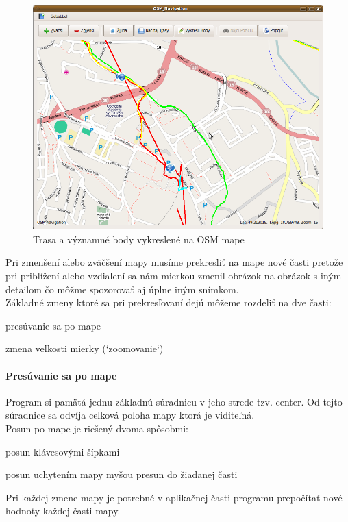 \begin{figure}[ht]
\centering
\includegraphics[width=14.5cm]{obr/mapa}
\caption{Trasa a významné body vykreslené na OSM mape}
\end{figure}



Pri zmenšení alebo zväčšení mapy musíme prekresliť na mape nové časti pretože pri priblížení alebo vzdialení sa nám mierkou zmenil obrázok na obrázok s iným detailom čo môžme spozorovať aj úplne iným snímkom.\\
Základné zmeny ktoré sa pri prekresľovaní dejú môžeme rozdeliť na dve časti: 
\begin{list}{•}
\item presúvanie sa po mape 
\item
\item zmena veľkosti mierky (`zoomovanie`)
\end{list}

\paragraph{Presúvanie sa po mape}
Program si pamätá jednu základnú súradnicu v jeho strede tzv. center. Od tejto súradnice sa odvíja celková poloha mapy ktorá je viditeľná.\\
Posun po mape je riešený dvoma spôsobmi:
\begin{list}{•}
\item posun klávesovými šípkami
\item
\item posun uchytením mapy myšou presun do žiadanej časti
\end{list}
Pri každej zmene mapy je potrebné v aplikačnej časti programu prepočítať nové hodnoty každej časti mapy. 


